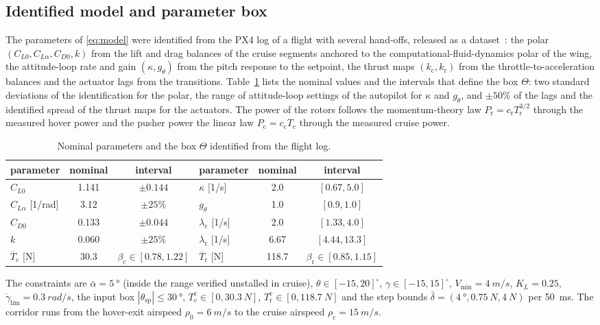 \documentclass[final,5p,times,twocolumn]{elsarticle}
\newcommand{\gth}{g_\theta}\newcommand{\thsp}{\theta_{\mathrm{sp}}}\newcommand{\lf}{\Lambda}
\newcommand{\numGdLim}{0.3}
\newcommand{\numKL}{0.25}
\begin{document}
\subsection{Identified model and parameter box}
The parameters of \eqref{eq:model} were identified from the PX4 log of a flight with several hand-offs, released as a dataset~\cite{Dony2026data}: the polar $(C_{L0},C_{L\alpha},C_{D0},k)$ from the lift and drag balances of the cruise segments anchored to the computational-fluid-dynamics polar of the wing, the attitude-loop rate and gain $(\kappa,\gth)$ from the pitch response to the setpoint, the thrust maps $(k_{\mathrm c},k_{\mathrm r})$ from the throttle-to-acceleration balances and the actuator lags from the transitions. Table~\ref{tab:box} lists the nominal values and the intervals that define the box $\Theta$: two standard deviations of the identification for the polar, the range of attitude-loop settings of the autopilot for $\kappa$ and $\gth$, and $\pm50\%$ of the lags and the identified spread of the thrust maps for the actuators. The power of the rotors follows the momentum-theory law $P_{\mathrm r}=c_{\mathrm r}T_{\mathrm r}^{3/2}$ through the measured hover power and the pusher power the linear law $P_{\mathrm c}=c_{\mathrm c}T_{\mathrm c}$ through the measured cruise power.
\begin{table}[t]\centering\footnotesize
\caption{Nominal parameters and the box $\Theta$ identified from the flight log.}\label{tab:box}
\setlength{\tabcolsep}{2.5pt}\scriptsize
\begin{tabular}{lcc|lcc}\toprule
parameter & nominal & interval & parameter & nominal & interval\\\midrule
$C_{L0}$ & 1.141 & $\pm0.144$ & $\kappa$ [1/s] & 2.0 & $[0.67,5.0]$\\
$C_{L\alpha}$ [1/rad] & 3.12 & $\pm25\%$ & $\gth$ & 1.0 & $[0.9,1.0]$\\
$C_{D0}$ & 0.133 & $\pm0.044$ & $\lambda_{\mathrm c}$ [1/s] & 2.0 & $[1.33,4.0]$\\
$k$ & 0.060 & $\pm25\%$ & $\lambda_{\mathrm r}$ [1/s] & 6.67 & $[4.44,13.3]$\\
$\overline T_{\mathrm c}$ [N] & 30.3 & $\beta_{\mathrm c}\in[0.78,1.22]$ & $\overline T_{\mathrm r}$ [N] & 118.7 & $\beta_{\mathrm r}\in[0.85,1.15]$\\
\bottomrule\end{tabular}\end{table}
The constraints are $\bar\alpha=\SI{5}{\degree}$ (inside the range verified unstalled in cruise), $\theta\in[-15,20]^\circ$, $\gamma\in[-15,15]^\circ$, $V_{\min}=\SI{4}{m/s}$, $K_L=\numKL{}$, $\dot\gamma_{\lim}=\SI{\numGdLim}{rad/s}$, the input box $|\thsp|\le\SI{30}{\degree}$, $T^{\mathrm c}_{\mathrm c}\in[0,\SI{30.3}{N}]$, $T^{\mathrm c}_{\mathrm r}\in[0,\SI{118.7}{N}]$ and the step bounds $\bar\delta=(\SI{4}{\degree},\SI{0.75}{N},\SI{4}{N})$ per \SI{50}{ms}. The corridor runs from the hover-exit airspeed $\rho_0=\SI{6}{m/s}$ to the cruise airspeed $\rho_{\mathrm c}=\SI{15}{m/s}$.
\end{document}
